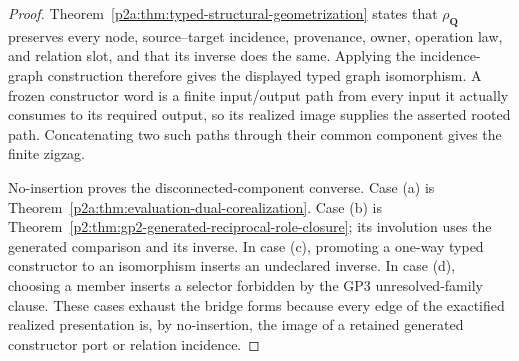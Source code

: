 \documentclass[12pt,a4paper]{article}
\begin{document}
\begin{proof}
Theorem~\ref{p2a:thm:typed-structural-geometrization} states that
\(\rho_{\mathbf Q}\) preserves every node, source--target incidence,
provenance, owner, operation law, and relation slot, and that its inverse does
the same.  Applying the incidence-graph construction therefore gives the
displayed typed graph isomorphism.  A frozen constructor word is a finite
input/output path from every input it actually consumes to its required
output, so its realized image supplies the asserted rooted path.  Concatenating
two such paths through their common component gives the finite zigzag.

No-insertion proves the disconnected-component converse.  Case (a) is
Theorem~\ref{p2a:thm:evaluation-dual-corealization}.  Case (b) is
Theorem~\ref{p2:thm:gp2-generated-reciprocal-role-closure}; its involution
uses the generated comparison and its inverse.  In case (c), promoting a
one-way typed constructor to an isomorphism inserts an undeclared inverse.  In
case (d), choosing a member inserts a selector forbidden by the GP3
unresolved-family clause.  These cases exhaust the bridge forms because every
edge of the exactified realized presentation is, by no-insertion, the image
of a retained generated constructor port or relation incidence.
\end{proof}
\end{document}
